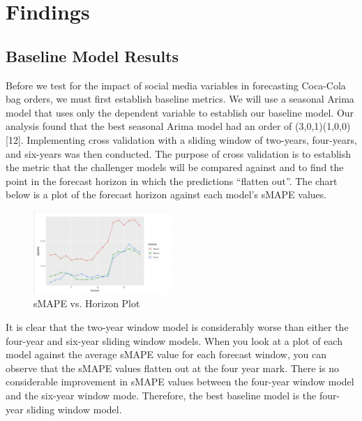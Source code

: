 \documentclass[12pt,oneside]{chicagocapstone}
\begin{document}
\hypertarget{findings}{%
\chapter*{Findings}\label{findings}}

\hypertarget{baseline-model-results}{%
\section*{Baseline Model Results}\label{baseline-model-results}}

Before we test for the impact of social media variables in forecasting Coca-Cola bag orders, we must first establish baseline metrics. We will use a seasonal Arima model that uses only the dependent variable to establish our baseline model. Our analysis found that the best seasonal Arima model had an order of (3,0,1)(1,0,0){[}12{]}. Implementing cross validation with a sliding window of two-years, four-years, and six-years was then conducted. The purpose of cross validation is to establish the metric that the challenger models will be compared against and to find the point in the forecast horizon in which the predictions ``flatten out''. The chart below is a plot of the forecast horizon against each model's sMAPE values.
\begin{figure}

{\centering \includegraphics[width=200px,angle = 0, scale=2.1]{figure/SMAPEvsHorizon} 

}

\caption{sMAPE vs. Horizon Plot}\label{fig:SMAPEvsHorizon}
\end{figure}
It is clear that the two-year window model is considerably worse than either the four-year and six-year sliding window models. When you look at a plot of each model against the average sMAPE value for each forecast window, you can observe that the sMAPE values flatten out at the four year mark. There is no considerable improvement in sMAPE values between the four-year window model and the six-year window mode. Therefore, the best baseline model is the four-year sliding window model.
\end{document}
